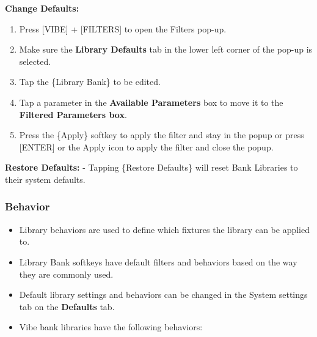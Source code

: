 \documentclass[
]{article}
\begin{document}
\textbf{Change Defaults:}

\begin{enumerate}
\def\labelenumi{\arabic{enumi}.}
\item
  Press {[}VIBE{]} + {[}FILTERS{]} to open the Filters pop-up.
\item
  Make sure the \textbf{Library Defaults} tab in the lower left corner of the pop-up is selected.
\item
  Tap the \{Library Bank\} to be edited.
\item
  Tap a parameter in the \textbf{Available Parameters} box to move it to the \textbf{Filtered Parameters box}.
\item
  Press the \{Apply\} softkey to apply the filter and stay in the popup or press {[}ENTER{]} or the Apply icon to apply the filter and close the popup.
\end{enumerate}

\textbf{Restore Defaults:} - Tapping \{Restore Defaults\} will reset Bank Libraries to their system defaults.

\hypertarget{behavior}{%
\subsubsection{Behavior}\label{behavior}}

\begin{itemize}
\item
  Library behaviors are used to define which fixtures the library can be applied to.
\item
  Library Bank softkeys have default filters and behaviors based on the way they are commonly used.
\item
  Default library settings and behaviors can be changed in the System settings tab on the \textbf{Defaults} tab.
\item
  Vibe bank libraries have the following behaviors:
\end{itemize}
\end{document}
